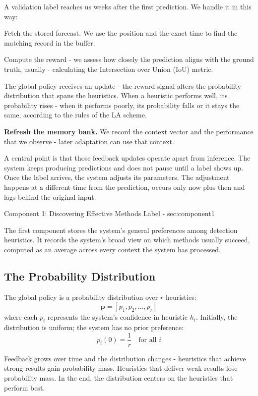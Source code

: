 \documentclass[11pt,a4paper]{article}
\begin{document}
A validation label reaches us weeks after the first prediction. We handle it in this way:

Fetch the stored forecast. 
We use the position and the exact time to find the matching record in the buffer.

Compute the reward - we assess how closely the prediction aligns with the ground truth, usually - calculating the Intersection over Union (IoU) metric.

The global policy receives an update - the reward signal alters the probability distribution that spans the heuristics. When a heuristic performs well, its probability rises - when it performs poorly, its probability falls or it stays the same, according to the rules of the LA scheme.

\item \textbf{Refresh the memory bank.} We record the context vector and the performance that we observe - later adaptation can use that context.

A central point is that those feedback updates operate apart from inference. The system keeps producing predictions and does not pause until a label shows up. Once the label arrives, the system adjusts its parameters. The adjustment happens at a different time from the prediction, occurs only now plus then and lags behind the original input.


Component 1: Discovering Effective Methods 
Label - sec:component1

The first component stores the system's general preferences among detection heuristics. It records the system's broad view on which methods usually succeed, computed as an average across every context the system has processed.

\subsection{The Probability Distribution}

The global policy is a probability distribution over $r$ heuristics:
\[
\mathbf{p} = [p_1, p_2, \ldots, p_r]
\]
where each $p_i$ represents the system's confidence in heuristic $h_i$. Initially, the distribution is uniform; the system has no prior preference:
\[
p_i(0) = \frac{1}{r} \quad \text{for all } i
\]

Feedback grows over time and the distribution changes - heuristics that achieve strong results gain probability mass. Heuristics that deliver weak results lose probability mass. In the end, the distribution centers on the heuristics that perform best.
\end{document}
